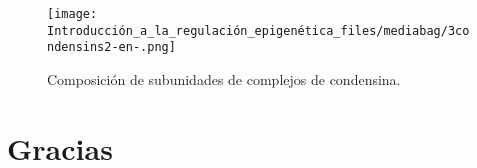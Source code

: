 \documentclass[
  letterpaper,
  DIV=11,
  numbers=noendperiod]{scrartcl}
\begin{document}
\begin{figure}[H]

{\centering \texttt{[image: Introducción\_a\_la\_regulación\_epigenética\_files/mediabag/3condensins2-en-.png]}

}

\caption{Composición de subunidades de complejos de condensina.}

\end{figure}%

\section{Gracias}\label{gracias}
\end{document}
